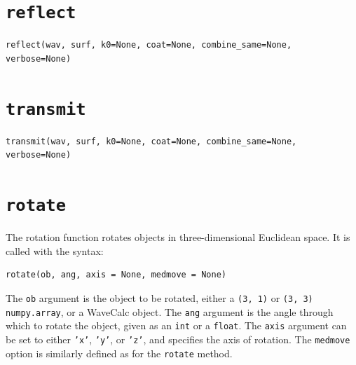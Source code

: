 \documentclass[11pt, reqno]{book}%
\newcounter{ct}
\newcommand{\tw}[1]{{\tt #1}}
\begin{document}

\section{\tw{reflect}}
\label{sec:reflfunction}

\begin{verbatim}
reflect(wav, surf, k0=None, coat=None, combine_same=None, verbose=None)
\end{verbatim}





\section{\tw{transmit}}
\label{sec:transfunction}


\begin{verbatim}
transmit(wav, surf, k0=None, coat=None, combine_same=None, verbose=None)
\end{verbatim}












\section{\tw{rotate}}
\label{sec:rotfunction}
The rotation function rotates objects in three-dimensional Euclidean space. It is called with the syntax:
\begin{verbatim}
rotate(ob, ang, axis = None, medmove = None)
\end{verbatim}
\noindent The \tw{ob} argument is the object to be rotated, either a \tw{(3, 1)} or \tw{(3, 3)} \tw{numpy.array}, or a WaveCalc object. The \tw{ang} argument is the angle through which to rotate the object, given as an \tw{int} or a \tw{float}. The \tw{axis} argument can be set to either \tw{'x'}, \tw{'y'}, or \tw{'z'}, and specifies the axis of rotation. The \tw{medmove} option is similarly defined as for the \tw{rotate} method.
\end{document}
